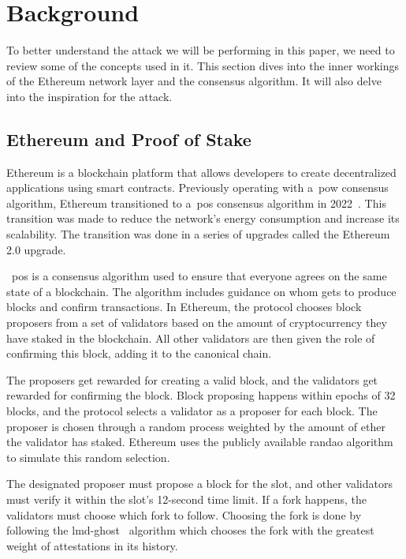
\section{Background}\label{sec:background}
To better understand the attack we will be performing in this paper, we need to review some of the concepts used in it.
This section dives into the inner workings of the Ethereum network layer and the consensus algorithm.
It will also delve into the inspiration for the attack.


\subsection{Ethereum and Proof of Stake}\label{subsec:ethereum-and-proof-of-stake}
Ethereum is a blockchain platform that allows developers to create decentralized applications using smart contracts.
Previously operating with a~\gls{pow} consensus algorithm, Ethereum transitioned to a~\gls{pos} consensus algorithm in 2022~\cite{EthereumProof-of-stakePoS}.
This transition was made to reduce the network's energy consumption and increase its scalability.
The transition was done in a series of upgrades called the Ethereum 2.0 upgrade.

~\gls{pos} is a consensus algorithm used to ensure that everyone agrees on the same state of a blockchain.
The algorithm includes guidance on whom gets to produce blocks and confirm transactions.
In Ethereum, the protocol chooses block proposers from a set of validators based on the amount of cryptocurrency they have staked in the blockchain.
All other validators are then given the role of confirming this block, adding it to the canonical chain.

The proposers get rewarded for creating a valid block, and the validators get rewarded for confirming the block.
Block proposing happens within epochs of 32 blocks, and the protocol selects a validator as a proposer for each block.
The proposer is chosen through a random process weighted by the amount of ether the validator has staked.
Ethereum uses the publicly available \gls{randao} algorithm to simulate this random selection.

The designated proposer must propose a block for the slot, and other validators must verify it within the slot's 12-second time limit.
If a fork happens, the validators must choose which fork to follow.
Choosing the fork is done by following the \gls{lmd-ghost}~\cite{EthereumProof-of-stakePoS} algorithm which chooses the fork with the greatest weight of attestations in its history.

